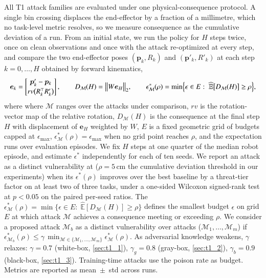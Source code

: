  All T1 attack families are evaluated under one physical-consequence protocol. A single bin crossing displaces the end-effector by a fraction of a millimetre, which no task-level metric resolves, so we measure consequence as the cumulative deviation of a run. From an initial state, we run the policy for $H$ steps twice, once on clean observations and once with the attack re-optimized at every step, and compare the two end-effector poses $(\bm{p}_k,R_k)$ and $(\bm{p}'_k,R'_k)$ at each step $k=0,\dots,H$ obtained by forward kinematics,
\begin{equation}
\bm{e}_{k}=\begin{bmatrix}\bm{p}'_{k}-\bm{p}_{k}\\[2pt]{rv}\bigl(R_{k}^{\top}R'_{k}\bigr)\end{bmatrix},
\qquad
D_{\mathcal{M}}(H)=\bigl\|W\bm{e}_{H}\bigr\|_{2},
\qquad
\epsilon^{*}_{\mathcal{M}}(\rho)=\min\Bigl\{\epsilon\in E:\;
\widehat{\mathbb{E}}\bigl[D_{\mathcal{M}}(H)\bigr]\ge\rho\Bigr\},
\label{eq:abbp-gate}
\vspace{-1.5ex}\end{equation}
where where $\mathcal{M}$ ranges over the attacks under comparison, ${rv}$ is the rotation-vector map of the relative rotation, 
$D_{\mathcal{M}}(H)$ is the consequence at the final step $H$ with displacement of $\bm{e}_{H}$ weighted by $W$, 
$E$ is a fixed geometric grid of budgets capped at $\epsilon_{\max}$, $\epsilon^{*}_{\mathcal{M}}(\rho)=\epsilon_{\max}$ when no grid point reaches $\rho$, and the expectation runs over evaluation episodes. 
We fix $H$ steps at one quarter of the median robot episode, and estimate $\epsilon^{*}$ independently for each of ten seeds. We report an attack as a distinct vulnerability at (\eg $\rho{=}5$\,cm the cumulative deviation threshold in our experiments) when its $\epsilon^{*}(\rho)$ improves over the best baseline by a threat-tier factor on at least two of three tasks, under a one-sided Wilcoxon signed-rank test at $p<0.05$ on the paired per-seed ratios. 
The $\epsilon^{*}_{\mathcal{M}}(\rho)=\min\{\epsilon\in E:\;\widehat{\mathbb{E}}[D_{\mathcal{M}}(H)]\ge\rho\}$ defines the smallest budget $\epsilon$ on grid $E$ at which attack $\mathcal{M}$ achieves a consequence meeting or exceeding $\rho$.
We consider a proposed attack $\mathcal{M}_b$ as a distinct vulnerability over attacks (\eg $\mathcal{M}_1,\dots,\mathcal{M}_m$) if $\epsilon^{*}_{{\mathcal{M}_b}}(\rho)\le\gamma\,\min_{\mathcal{M}\in\{\mathcal{M}_1,\dots,\mathcal{M}_m\}}\epsilon^{*}_{\mathcal{M}}(\rho)$.
As adversarial knowledge weakens, $\gamma$ relaxes: $\gamma{=}0.7$ (white-box, \autoref{sec:t1_1}), $\gamma_{g}{=}0.8$ (gray-box, \autoref{sec:t1_2}), $\gamma_{b}{=}0.9$ (black-box, \autoref{sec:t1_3}). Training-time attacks use the poison rate as budget. Metrics are reported as mean~$\pm$~std across runs. 

